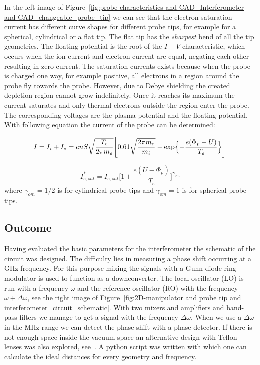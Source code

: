 In the left image of Figure~\ref{fig:probe characteristics and CAD_Interferometer and CAD_changeable_probe_tip} we can see that the electron saturation current has different curve shapes for different probe tips, for example for a spherical, cylindrical or a flat tip. The flat tip has the \emph{sharpest} bend of all the tip geometries.
The floating potential is the root of the $I-V$-characteristic, which occurs when the ion current and electron current are equal, negating each other resulting in zero current.
The saturation currents exists because when the probe is charged one way, for example positive, all electrons in a region around the probe fly towards the probe. However, due to Debye shielding the created depletion region cannot grow indefinitely. Once it reaches its maximum the current saturates and only thermal electrons outside the region enter the probe. The corresponding voltages are the plasma potential and the floating potential. With following equation the current of the probe can be determined:

\begin{equation}
    I=I_i+I_e=enS \sqrt{\frac{T_e}{2 \pi m_e}}
    \Biggr[0.61 \sqrt{\frac{2 \pi m_e}{m_i}}-\exp\Bigl\{-\frac{e(\Phi_p -U)}{T_e}\Bigr\}
        \Biggl]
\end{equation}


\begin{equation}
    I^*_{e,sat} =I_{e,sat}\Biggr[1+ \frac{e(U-\Phi_p)}{T_e}\Biggl]^{\gamma_{om}}
\end{equation}
where $\gamma_{om}= 1/2$ is for cylindrical probe tips and $\gamma_{om}= 1$ is for spherical probe tips. \cite{Stroth_Plasmaphysik}



\subsection{Outcome}

Having evaluated the basic parameters for the interferometer the schematic of the circuit was designed. The difficulty lies in measuring a phase shift occurring at a GHz frequency. For this purpose mixing the signals with a  Gunn diode ring modulator is used to function as a downconverter. The local oscillator (LO) is run with a frequency $\omega$ and the reference oscillator (RO) with the frequency $\omega + \Delta \omega$, see the right image of Figure~\ref{fig:2D-manipulator and probe tip and interferometer_circuit_schematic}. With two mixers and amplifiers and band-pass filters we manage to get a signal with the frequency $\Delta \omega$. When we use a $\Delta \omega$ in the MHz range we can detect the phase shift with a phase detector. If there is not enough space inside the vacuum space an alternative design with Teflon lenses was also explored, see~\cite{2012JInst...7C1107C}. A python script was written with which one can calculate the ideal distances for every geometry and frequency. \\

